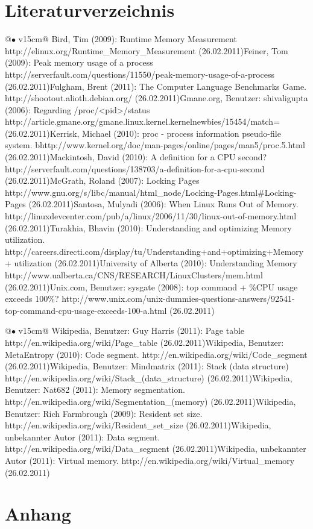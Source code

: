\documentclass{fancydocument}
\begin{document}
\section{Literaturverzeichnis}
\noindent
\begin{tabularx}{\linewidth}{@{$\bullet$  }v{15cm}@{}}
Bird, Tim (2009): Runtime Memory Measurement
http://elinux.org/Runtime\_Memory\_Measurement (26.02.2011)\tabularnewline[3pt]
Feiner, Tom (2009): Peak memory usage of a process
http://serverfault.com/questions/11550/peak-memory-usage-of-a-process (26.02.2011)\tabularnewline[3pt]
Fulgham, Brent (2011): The Computer Language Benchmarks Game.
http://shootout.alioth.debian.org/ (26.02.2011)\tabularnewline[3pt]
Gmane.org, Benutzer: shivaligupta (2006): Regarding /proc/<pid>/status
http://article.gmane.org/gmane.linux.kernel.kernelnewbies/15454/match= (26.02.2011)\tabularnewline[3pt]
Kerrisk, Michael (2010): proc - process information pseudo-file system.
bhttp://www.kernel.org/doc/man-pages/online/pages/man5/proc.5.html (26.02.2011)\tabularnewline[3pt]
Mackintosh, David (2010): A definition for a CPU second?
http://serverfault.com/questions/138703/a-definition-for-a-cpu-second (26.02.2011)\tabularnewline[3pt]
McGrath, Roland (2007): Locking Pages
http://www.gnu.org/s/libc/manual/html\_node/Locking-Pages.html#Locking-Pages (26.02.2011)\tabularnewline[3pt]
Santosa, Mulyadi (2006): When Linux Runs Out of Memory.
http://linuxdevcenter.com/pub/a/linux/2006/11/30/linux-out-of-memory.html (26.02.2011)\tabularnewline[3pt]
Turakhia, Bhavin (2010): Understanding and optimizing Memory utilization.
http://careers.directi.com/display/tu/Understanding+and+optimizing+Memory+ utilization (26.02.2011)\tabularnewline[3pt]
University of Alberta (2010): Understanding Memory
http://www.ualberta.ca/CNS/RESEARCH/LinuxClusters/mem.html (26.02.2011)\tabularnewline[3pt]
Unix.com, Benutzer: sysgate (2008): top command + \%CPU usage exceeds 100\%?
http://www.unix.com/unix-dummies-questions-answers/92541-top-command-cpu-usage-exceeds-100-a.html (26.02.2011)\tabularnewline[3pt]
\end{tabularx}
\newpage
\noindent
\begin{tabularx}{\linewidth}{@{$\bullet$  }v{15cm}@{}}
Wikipedia, Benutzer: Guy Harris (2011): Page table
http://en.wikipedia.org/wiki/Page\_table (26.02.2011)\tabularnewline[3pt]
Wikipedia, Benutzer: MetaEntropy (2010): Code segment.
http://en.wikipedia.org/wiki/Code\_segment (26.02.2011)\tabularnewline[3pt]
Wikipedia, Benutzer: Mindmatrix (2011): Stack (data structure)
http://en.wikipedia.org/wiki/Stack\_(data\_structure) (26.02.2011)\tabularnewline[3pt]
Wikipedia, Benutzer: Nat682 (2011): Memory segmentation.
http://en.wikipedia.org/wiki/Segmentation\_(memory) (26.02.2011)\tabularnewline[3pt]
Wikipedia, Benutzer: Rich Farmbrough (2009): Resident set size.
http://en.wikipedia.org/wiki/Resident\_set\_size (26.02.2011)\tabularnewline[3pt]
Wikipedia, unbekannter Autor (2011): Data segment.
http://en.wikipedia.org/wiki/Data\_segment (26.02.2011)\tabularnewline[3pt]
Wikipedia, unbekannter Autor (2011): Virtual memory.
http://en.wikipedia.org/wiki/Virtual\_memory (26.02.2011)\tabularnewline[3pt]
\end{tabularx}

\section{Anhang}
\end{document}

